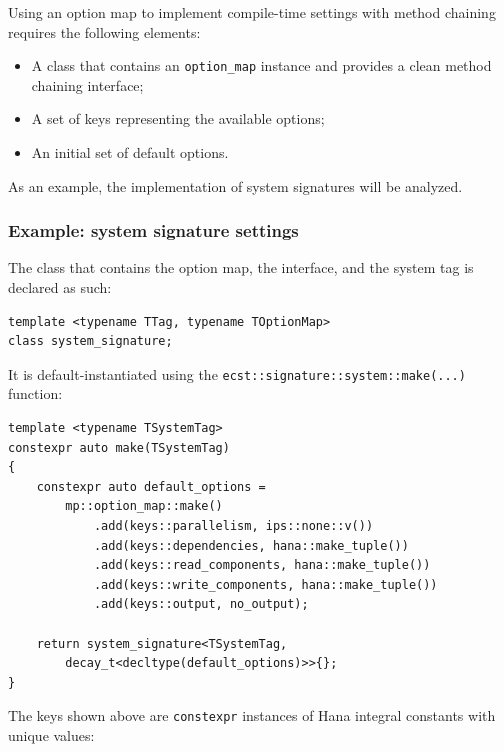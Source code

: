 \documentclass[oneside, 12pt, a4paper, openany]{book}
\begin{document}
Using an option map to implement compile-time settings with method
chaining requires the following elements:

\begin{itemize}
\item
  A class that contains an
  \texttt{option_map}
  instance and provides a clean method chaining interface;
\item
  A set of keys representing the available options;
\item
  An initial set of default options.
\end{itemize}

As an example, the implementation of system signatures will be analyzed.

\subsubsection{Example: system signature
settings}\label{example-system-signature-settings}

The class that contains the option map, the interface, and the system
tag is declared as such:

\begin{verbatim}
template <typename TTag, typename TOptionMap>
class system_signature;
\end{verbatim}

It is default-instantiated using the
\texttt{ecst::signature::system::make(...)}
function:

\begin{verbatim}
template <typename TSystemTag>
constexpr auto make(TSystemTag)
{
    constexpr auto default_options =
        mp::option_map::make()
            .add(keys::parallelism, ips::none::v())
            .add(keys::dependencies, hana::make_tuple())
            .add(keys::read_components, hana::make_tuple())
            .add(keys::write_components, hana::make_tuple())
            .add(keys::output, no_output);

    return system_signature<TSystemTag,
        decay_t<decltype(default_options)>>{};
}
\end{verbatim}

The keys shown above are
\texttt{constexpr}
instances of Hana integral constants with unique values:
\end{document}
